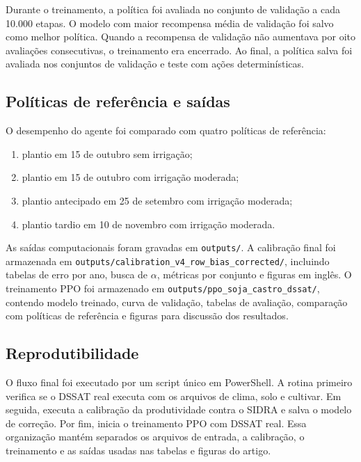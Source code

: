 Durante o treinamento, a política foi avaliada no conjunto de validação a cada
10.000 etapas. O modelo com maior recompensa média de validação foi salvo como
melhor política. Quando a recompensa de validação não aumentava por oito
avaliações consecutivas, o treinamento era encerrado. Ao final, a política salva
foi avaliada nos conjuntos de validação e teste com ações determinísticas.

\subsection{Políticas de referência e saídas}
\label{subsec:baselines_saidas}

O desempenho do agente foi comparado com quatro políticas de referência:
\begin{enumerate}
    \item plantio em 15 de outubro sem irrigação;
    \item plantio em 15 de outubro com irrigação moderada;
    \item plantio antecipado em 25 de setembro com irrigação moderada;
    \item plantio tardio em 10 de novembro com irrigação moderada.
\end{enumerate}

As saídas computacionais foram gravadas em \texttt{outputs/}. A calibração final
foi armazenada em \texttt{outputs/calibration\_v4\_row\_bias\_corrected/},
incluindo tabelas de erro por ano, busca de $\alpha$, métricas por conjunto e
figuras em inglês. O treinamento PPO foi armazenado em
\texttt{outputs/ppo\_soja\_castro\_dssat/}, contendo modelo treinado, curva de
validação, tabelas de avaliação, comparação com políticas de referência e
figuras para discussão dos resultados.

\subsection{Reprodutibilidade}
\label{subsec:reprodutibilidade}

O fluxo final foi executado por um script único em PowerShell. A rotina primeiro
verifica se o DSSAT real executa com os arquivos de clima, solo e cultivar. Em
seguida, executa a calibração da produtividade contra o SIDRA e salva o modelo
de correção. Por fim, inicia o treinamento PPO com DSSAT real. Essa organização
mantém separados os arquivos de entrada, a calibração, o treinamento e as saídas
usadas nas tabelas e figuras do artigo.
